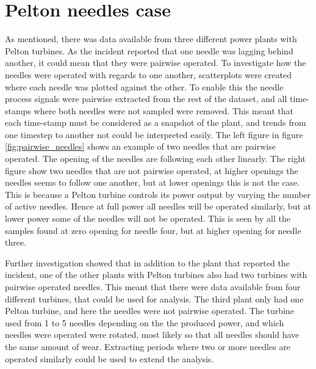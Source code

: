 \section{Pelton needles case}\label{sub:pelton_needles}
    As mentioned, there was data available from three different power plants with Pelton turbines. As the incident reported that one needle was lagging behind another, it could mean that they were pairwise operated. To investigate how the needles were operated with regards to one another, scatterplots were created where each needle was plotted against the other. To enable this the needle process signals were pairwise extracted from the rest of the dataset, and all time-stamps where both needles were not sampled were removed. This meant that each time-stamp must be considered as a snapshot of the plant, and trends from one timestep to another not could be interpreted easily. The left figure in figure \ref{fig:pairwise_needles} shows an example of two needles that are pairwise operated. The opening of the needles are following each other linearly. The right figure show two needles that are not pairwise operated, at higher openings the needles seems to follow one another, but at lower openings this is not the case. This is because a Pelton turbine controls its power output by varying the number of active needles. Hence at full power all needles will be operated similarly, but at lower power some of the needles will not be operated. This is seen by all the samples found at zero opening for needle four, but at higher opening for needle three. 
    
    Further investigation showed that in addition to the plant that reported the incident, one of the other plants with Pelton turbines also had two turbines with pairwise operated needles. This meant that there were data available from four different turbines, that could be used for analysis. The third plant only had one Pelton turbine, and here the needles were not pairwise operated. The turbine used from 1 to 5 needles depending on the the produced power, and which needles were operated were rotated, most likely so that all needles should have the same amount of wear. Extracting periods where two or more needles are operated similarly could be used to extend the analysis.   
    

